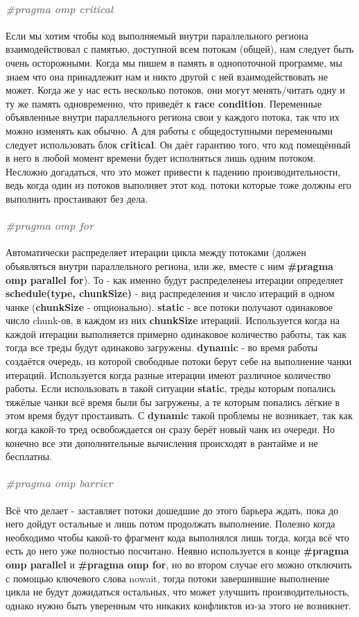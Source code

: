 \documentclass{article}
\begin{document}
\paragraph{\textcolor{gray}{\textit{\LARGE{\#pragma omp critical}}}}
Если мы хотим чтобы код выполняемый внутри параллельного региона взаимодействовал с памятью, доступной всем потокам (общей), нам следует быть очень осторожными. Когда мы пишем в память в однопоточной программе, мы знаем что она принадлежит нам и никто другой с ней взаимодействовать не может. Когда же у нас есть несколько потоков, они могут менять/читать одну и ту же память одновременно, что приведёт к \textbf{race condition}. Переменные объявленные внутри параллельного региона свои у каждого потока, так что их можно изменять как обычно. А для работы с общедоступными переменными следует использовать блок \textbf{critical}. Он даёт гарантию того, что код помещённый в него в любой момент времени будет исполняться лишь одним потоком. Несложно догадаться, что это может привести к падению производительности, ведь когда один из потоков выполняет этот код, потоки которые тоже должны его выполнить простаивают без дела.
\paragraph{\textcolor{gray}{\textit{\LARGE{\#pragma omp for}}}}
Автоматически распределяет итерации цикла между потоками (должен объявляться внутри параллельного региона, или же, вместе с ним \textbf{\#pragma omp parallel for}). То - как именно будут распределенеы итерации определяет \textbf{schedule(type, chunkSize)} - вид распределения и число итераций в одном чанке (\textbf{chunkSize} - опционально). \textbf{static} - все потоки получают одинаковое число chunk-ов, в каждом из них \textbf{chunkSize} итераций. Используется когда на каждой итерации выполняется примерно одинаковое количество работы, так как тогда все треды будут одинаково загружены. \textbf{dynamic} - во время работы создаётся очередь, из которой свободные потоки берут себе на выполнение чанки итераций. Используется когда разные итерации имеют различное количество работы. Если использовать в такой ситуации \textbf{static}, треды которым попались тяжёлые чанки всё время были бы загружены, а те которым попались лёгкие в этом время будут простаивать. С \textbf{dynamic} такой проблемы не возникает, так как когда какой-то тред освобождается он сразу берёт новый чанк из очереди. Но конечно все эти дополнительные вычисления происходят в рантайме и не бесплатны.
\paragraph{\textcolor{gray}{\textit{\LARGE{\#pragma omp barrier}}}}
Всё что делает - заставляет потоки дошедшие до этого барьера ждать, пока до него дойдут остальные и лишь потом продолжать выполнение. Полезно когда необходимо чтобы какой-то фрагмент кода выполнялся лишь тогда, когда всё что есть до него уже полностью посчитано. Неявно используется в конце \textbf{\#pragma omp parallel} и \textbf{\#pragma omp for}, но во втором случае его можно отключить с помощью ключевого слова nowait, тогда потоки завершившие выполнение цикла не будут дожидаться остальных, что может улучшить производительность, однако нужно быть уверенным что никаких конфликтов из-за этого не возникнет.
\end{document}
